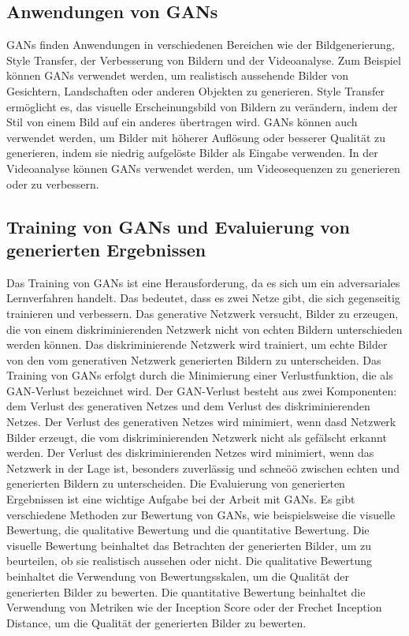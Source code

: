     \subsection{Anwendungen von GANs}
    
        GANs finden Anwendungen in verschiedenen Bereichen wie der Bildgenerierung, Style Transfer, der Verbesserung von Bildern und der Videoanalyse.      
        Zum Beispiel können GANs verwendet werden, um realistisch aussehende Bilder von Gesichtern, Landschaften oder anderen Objekten zu generieren.      %
        Style Transfer ermöglicht es, das visuelle Erscheinungsbild von Bildern zu verändern, indem der Stil von einem Bild auf ein anderes übertragen wird.      %
        GANs können auch verwendet werden, um Bilder mit höherer Auflösung oder besserer Qualität zu generieren, indem sie niedrig aufgelöste Bilder als Eingabe verwenden.      
        In der Videoanalyse können GANs verwendet werden, um Videosequenzen zu generieren oder zu verbessern.%

    \subsection{Training von GANs und Evaluierung von generierten Ergebnissen}

        Das Training von GANs ist eine Herausforderung, da es sich um ein adversariales Lernverfahren handelt.      
        Das bedeutet, dass es zwei Netze gibt, die sich gegenseitig trainieren und verbessern.      %
        Das generative Netzwerk versucht, Bilder zu erzeugen, die von einem diskriminierenden Netzwerk nicht von echten Bildern unterschieden werden können.      
        Das diskriminierende Netzwerk wird trainiert, um echte Bilder von den vom generativen Netzwerk generierten Bildern zu unterscheiden.
        Das Training von GANs erfolgt durch die Minimierung einer Verlustfunktion, die als GAN-Verlust bezeichnet wird.      
        Der GAN-Verlust besteht aus zwei Komponenten: dem Verlust des generativen Netzes und dem Verlust des diskriminierenden Netzes.      
        Der Verlust des generativen Netzes wird minimiert, wenn dasd Netzwerk Bilder erzeugt, die vom diskriminierenden Netzwerk nicht als gefälscht erkannt werden.      
        Der Verlust des diskriminierenden Netzes wird minimiert, wenn das Netzwerk in der Lage ist, besonders zuverlässig und schneöö zwischen echten und generierten Bildern zu unterscheiden.
        Die Evaluierung von generierten Ergebnissen ist eine wichtige Aufgabe bei der Arbeit mit GANs.      
        Es gibt verschiedene Methoden zur Bewertung von GANs, wie beispielsweise die visuelle Bewertung, die qualitative Bewertung und die quantitative Bewertung.  
        Die visuelle Bewertung beinhaltet das Betrachten der generierten Bilder, um zu beurteilen, ob sie realistisch aussehen oder nicht.      
        Die qualitative Bewertung beinhaltet die Verwendung von Bewertungsskalen, um die Qualität der generierten Bilder zu bewerten.      
        Die quantitative Bewertung beinhaltet die Verwendung von Metriken wie der Inception Score oder der Frechet Inception Distance, um die Qualität der generierten Bilder zu bewerten.

